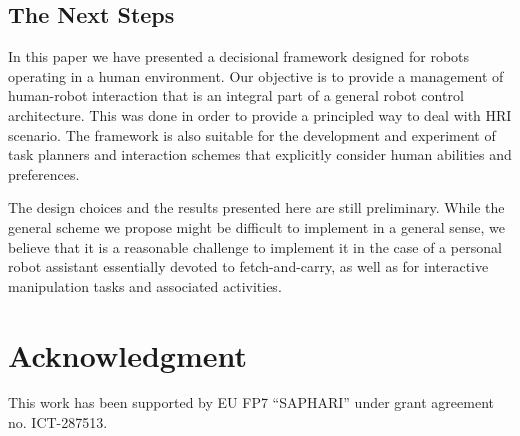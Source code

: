 \documentclass[preprint,12pt]{elsarticle}
\begin{document}
\subsection{The Next Steps}


In this paper we have presented a decisional framework designed for
robots operating in a human environment. Our objective is to provide a
management of human-robot interaction that is an integral part of a
general robot control architecture.  This was done in order to provide
a principled way to deal with HRI scenario.  The framework is also
suitable for the development and experiment of task planners and
interaction schemes that explicitly consider human abilities and
preferences.

The design choices and the results presented here are still preliminary.
While the general scheme we propose might be difficult to implement in
a general sense, we believe that it is a reasonable challenge to
implement it in the case of a personal robot assistant essentially
devoted to fetch-and-carry, as well as for interactive manipulation
tasks and associated activities.



\section*{Acknowledgment}

This work has been supported by EU FP7 ``SAPHARI'' under grant agreement no. ICT-287513.


%

\end{document}
